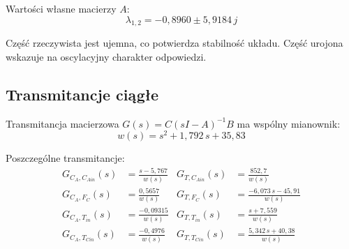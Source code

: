 \documentclass[a4paper,12pt]{article}
\begin{document}
Wartości własne macierzy $A$:
\begin{equation}
    \lambda_{1,2} = -0{,}8960 \pm 5{,}9184\,j
\end{equation}

Część rzeczywista jest ujemna, co potwierdza stabilność układu. Część urojona wskazuje na oscylacyjny charakter odpowiedzi.

\subsection{Transmitancje ciągłe}

Transmitancja macierzowa $G(s) = C(sI - A)^{-1}B$ ma wspólny mianownik:
\begin{equation}
    w(s) = s^2 + 1{,}792\,s + 35{,}83
\end{equation}

Poszczególne transmitancje:
\begin{align}
    G_{C_A, C_{Ain}}(s) &= \frac{s - 5{,}767}{w(s)} &
    G_{T, C_{Ain}}(s) &= \frac{852{,}7}{w(s)} \\[6pt]
    G_{C_A, F_C}(s) &= \frac{0{,}5657}{w(s)} &
    G_{T, F_C}(s) &= \frac{-6{,}073\,s - 45{,}91}{w(s)} \\[6pt]
    G_{C_A, T_{in}}(s) &= \frac{-0{,}09315}{w(s)} &
    G_{T, T_{in}}(s) &= \frac{s + 7{,}559}{w(s)} \\[6pt]
    G_{C_A, T_{Cin}}(s) &= \frac{-0{,}4976}{w(s)} &
    G_{T, T_{Cin}}(s) &= \frac{5{,}342\,s + 40{,}38}{w(s)}
\end{align}
\end{document}
